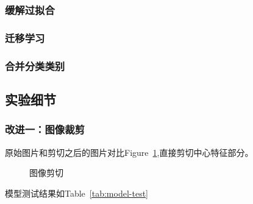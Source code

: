 \documentclass{article}
\begin{document}
\begin{CJK}{UTF8}{gbsn}
\subsubsection{缓解过拟合}

\subsubsection{迁移学习}

\subsubsection{合并分类类别}


\subsection{实验细节}

\subsubsection{改进一：图像裁剪}\label{clip}
原始图片和剪切之后的图片对比Figure~\ref{fig:origin-clip},直接剪切中心特征部分。
\begin{figure}[!ht]
    \centering
    \hfill
    \caption{图像剪切}
    \label{fig:origin-clip}
\end{figure}
模型测试结果如Table~\ref{tab:model-test}


\end{CJK}
\end{document}
